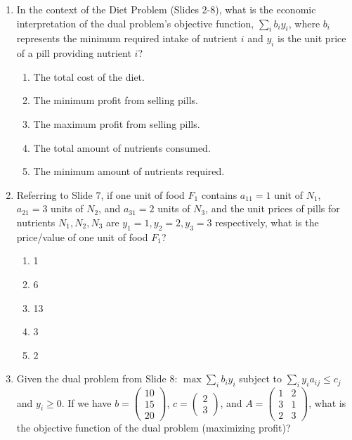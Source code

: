 \documentclass{article}%
\begin{document}
\begin{enumerate}
\begin{enumerate}%
\item Minimize $2x_1 + 3x_2$%
\item Minimize $10x_1 + 15x_2 + 20x_3$%
\item Maximize $10y_1 + 15y_2 + 20y_3$%
\item Minimize $x_1 + x_2$%
\item Maximize $2y_1 + 3y_2$%
\end{enumerate}%
\vspace{1em}%
\item In the context of the Diet Problem (Slides 2-8), what is the economic interpretation of the dual problem's objective function, $\sum_i b_i y_i$, where $b_i$ represents the minimum required intake of nutrient $i$ and $y_i$ is the unit price of a pill providing nutrient $i$?%
\begin{enumerate}%
\item The total cost of the diet.%
\item The minimum profit from selling pills.%
\item The maximum profit from selling pills.%
\item The total amount of nutrients consumed.%
\item The minimum amount of nutrients required.%
\end{enumerate}%
\vspace{1em}%
\item Referring to Slide 7, if one unit of food $F_1$ contains $a_{11} = 1$ unit of $N_1$, $a_{21} = 3$ units of $N_2$, and $a_{31} = 2$ units of $N_3$, and the unit prices of pills for nutrients $N_1, N_2, N_3$ are $y_1 = 1, y_2 = 2, y_3 = 3$ respectively, what is the price/value of one unit of food $F_1$?%
\begin{enumerate}%
\item 1%
\item 6%
\item 13%
\item 3%
\item 2%
\end{enumerate}%
\vspace{1em}%
\item Given the dual problem from Slide 8: $\max \sum_i b_i y_i$ subject to $\sum_i y_i a_{ij} \le c_j$ and $y_i \ge 0$. If we have $b = \begin{pmatrix} 10 \\ 15 \\ 20 \end{pmatrix}$, $c = \begin{pmatrix} 2 \\ 3 \end{pmatrix}$, and $A = \begin{pmatrix} 1 & 2 \\ 3 & 1 \\ 2 & 3 \end{pmatrix}$, what is the objective function of the dual problem (maximizing profit)?%

\end{enumerate}
\end{document}
